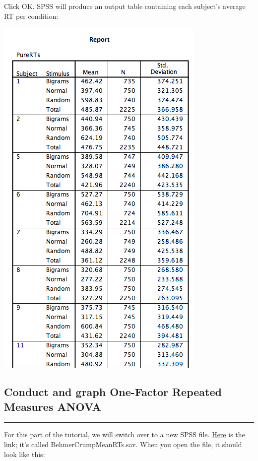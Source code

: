 \documentclass[
]{book}
\begin{document}
Click {OK}. SPSS will produce an output table containing each subject's average RT per condition:

\includegraphics{img/9.4.21.png}

\hypertarget{conduct-and-graph-one-factor-repeated-measures-anova}{%
\subsection{Conduct and graph One-Factor Repeated Measures ANOVA}\label{conduct-and-graph-one-factor-repeated-measures-anova}}

\begin{center}\rule{0.5\linewidth}{0.5pt}\end{center}

For this part of the tutorial, we will switch over to a new SPSS file. \href{https://github.com/CrumpLab/statisticsLab/blob/master/data/spssdata/BehmerCrumpMeanRTs.sav}{Here} is the link; it's called BehmerCrumpMeanRTs.sav. When you open the file, it should look like this:
\end{document}
